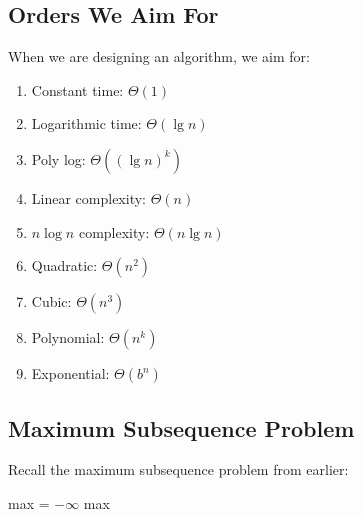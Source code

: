 \documentclass[]{article}
\theoremstyle{definition}
\begin{document}
		\subsection{Orders We Aim For}
			When we are designing an algorithm, we aim for:
			\begin{enumerate}
				\item Constant time: $\Theta(1)$
				\item Logarithmic time: $\Theta(\lg n)$
				\item Poly log: $\Theta((\lg n)^{k})$
				\item Linear complexity: $\Theta(n)$
				\item $n \log n$ complexity: $\Theta(n \lg n)$
				\item Quadratic: $\Theta(n^2)$
				\item Cubic: $\Theta(n^3)$
				\item Polynomial: $\Theta(n^k)$
				\item Exponential: $\Theta(b^n)$
			\end{enumerate}

		\subsection{Maximum Subsequence Problem}
			Recall the maximum subsequence problem from earlier: \\
			\begin{algorithm}[H]
				max = $-\infty$\;
				\Return max
			\end{algorithm}
\end{document}
